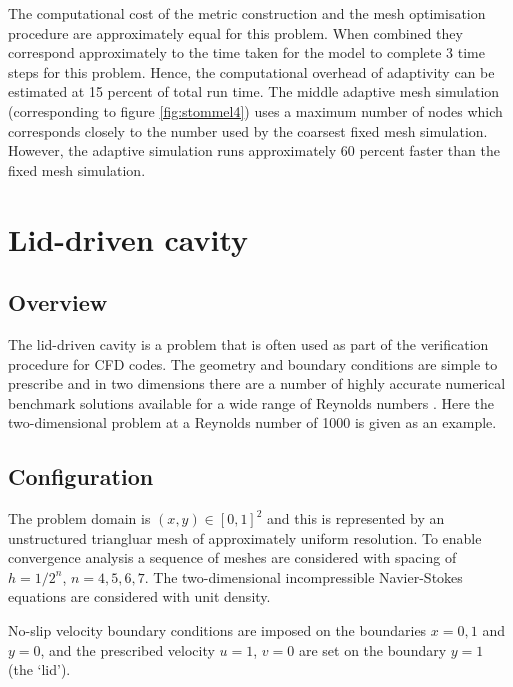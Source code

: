 The computational cost of the metric construction and the mesh optimisation procedure are approximately
equal for this problem. When combined they correspond approximately to the time taken for the model
to complete 3 time steps for this problem. Hence, the computational overhead of adaptivity can be estimated
at 15 percent of total run time. The middle adaptive mesh simulation (corresponding to figure \ref{fig:stommel4})
uses a maximum number of nodes which corresponds closely to the number used by the coarsest fixed mesh simulation.
However, the adaptive simulation runs approximately 60 percent faster than the fixed mesh simulation.



\section{Lid-driven cavity}
\label{sect:lid_driven_cavity}

\subsection{Overview}
The lid-driven cavity is a problem that is often used as part of the verification procedure for
CFD codes. The geometry and boundary conditions are simple to prescribe and in
two dimensions there are a number of highly accurate numerical benchmark solutions
available for a wide range of Reynolds numbers \citep{botella1998,erturk2005,bruneau2006}. 
Here the two-dimensional problem at a Reynolds number of 1000 is given as an example.

\subsection{Configuration}
The problem domain is $(x,y) \in [0,1]^2$ and this is represented by an unstructured triangluar mesh
of approximately uniform resolution. To enable convergence analysis a sequence of meshes are considered
with spacing of $h=1/2^n$, $n=4,5,6,7$. The two-dimensional incompressible Navier-Stokes equations are
considered with unit density.

No-slip velocity boundary conditions are imposed on the boundaries $x=0,1$ and $y=0$, 
and the prescribed velocity $u=1$, $v=0$ are set on the boundary $y=1$ (the `lid'). 

